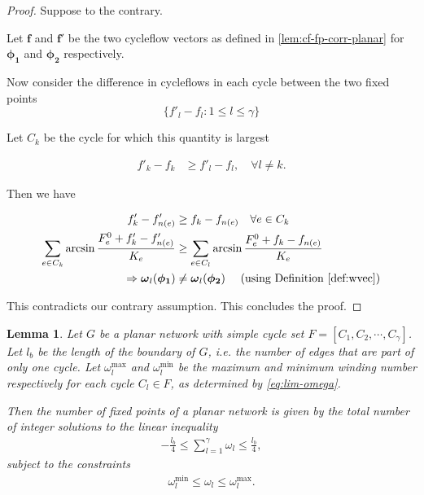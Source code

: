 \documentclass[10pt,aps,pra,onecolumn,superscriptaddress]{revtex4-1}
\renewcommand{\vec}[1]{\boldsymbol{#1}}
\newtheorem{lemma}{Lemma}
\begin{document}
\begin{proof}
Suppose to the contrary.   

Let $\vec{f}$ and $\vec{f'}$ be the two cycleflow vectors as defined in 
\ref{lem:cf-fp-corr-planar} for $\vec{\phi_1}$ and $\vec{\phi_2}$ 
respectively.   



Now consider the difference in cycleflows in each cycle between the two fixed points
\[
\{f'_l-f_l:1\leq l \leq \gamma\}
\]

Let $C_k$ be the cycle for which this quantity is largest

\begin{align}
\label{}
f'_k-f_k & \geq f'_l-f_l,\quad \forall l\neq k.  
\end{align}

Then we have

\begin{align}
\label{}
f'_k-f'_{n(e)} & \geq f_k-f_{n(e)} \quad\forall e\in C_k\\
\sum_{e\in C_k} \arcsin{\frac{F_e^0+f'_k-f'_{n(e)}}{K_e}} &\geq \sum_{e\in C_l} \arcsin{\frac{F_e^0+f_k-f_{n(e)}}{K_e}}\\
\Rightarrow \vec\omega_l(\vec{\phi_1})&\neq 
\vec\omega_l(\vec{\phi_2})\quad\text{ (using Definition \ref{def:wvec})}
\end{align}

This contradicts our contrary assumption.   
This concludes the proof.  
\end{proof}
 


\begin{lemma}
\label{}
Let $G$ be a planar network with simple cycle set $F=[C_1,C_2,\cdots,C_{\gamma}]$. Let $l_b$ be the length of the \emph{boundary} 
of $G$, i.e. the number of edges that are part of only one cycle.  Let 
$\omega^{\max}_l$ and $\omega^{\min}_l$ be the maximum and minimum winding 
number respectively for each cycle $C_l\in F$, as determined by \eqref{eq:lim-omega}.

Then the number of fixed points of a planar network is given by the total number of 
integer solutions to the linear inequality
\begin{align}
\label{}
-\frac{l_b}{4} \leq \sum_{l=1}^{\gamma} \omega_l \leq \frac{l_b}{4},
\end{align}
subject to the constraints
\begin{align}
\label{}
\omega^{\min}_l \leq \omega_l \leq \omega^{\max}_l.  
\end{align}
\end{lemma}
\end{document}
